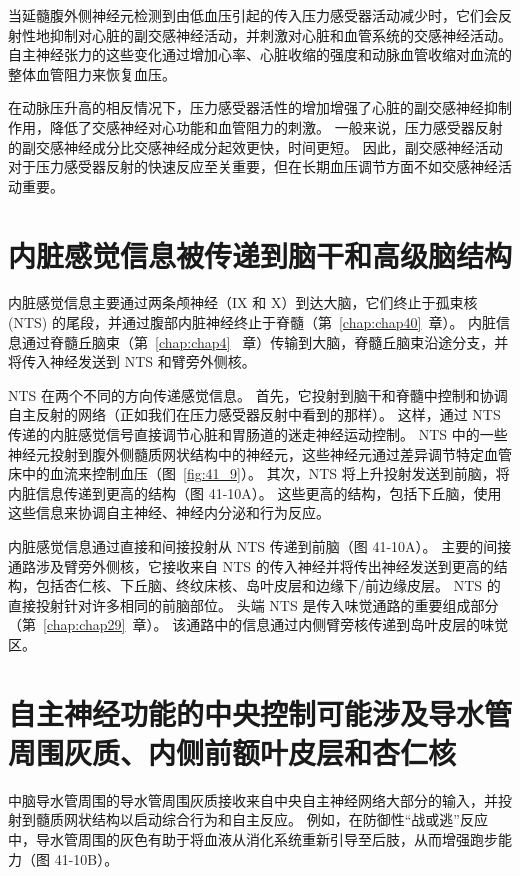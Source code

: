 当延髓腹外侧神经元检测到由低血压引起的传入压力感受器活动减少时，它们会反射性地抑制对心脏的副交感神经活动，并刺激对心脏和血管系统的交感神经活动。
自主神经张力的这些变化通过增加心率、心脏收缩的强度和动脉血管收缩对血流的整体血管阻力来恢复血压。


在动脉压升高的相反情况下，压力感受器活性的增加增强了心脏的副交感神经抑制作用，降低了交感神经对心功能和血管阻力的刺激。
一般来说，压力感受器反射的副交感神经成分比交感神经成分起效更快，时间更短。
因此，副交感神经活动对于压力感受器反射的快速反应至关重要，但在长期血压调节方面不如交感神经活动重要。



\section{内脏感觉信息被传递到脑干和高级脑结构}

内脏感觉信息主要通过两条颅神经（IX 和 X）到达大脑，它们终止于孤束核 (NTS) 的尾段，并通过腹部内脏神经终止于脊髓（第~\ref{chap:chap40}~章）。
内脏信息通过脊髓丘脑束（第~\ref{chap:chap4}~ 章）传输到大脑，脊髓丘脑束沿途分支，并将传入神经发送到 NTS 和臂旁外侧核。


NTS 在两个不同的方向传递感觉信息。
首先，它投射到脑干和脊髓中控制和协调自主反射的网络（正如我们在压力感受器反射中看到的那样）。
这样，通过 NTS 传递的内脏感觉信号直接调节心脏和胃肠道的迷走神经运动控制。
NTS 中的一些神经元投射到腹外侧髓质网状结构中的神经元，这些神经元通过差异调节特定血管床中的血流来控制血压（图~\ref{fig:41_9}）。
其次，NTS 将上升投射发送到前脑，将内脏信息传递到更高的结构（图 41-10A）。
这些更高的结构，包括下丘脑，使用这些信息来协调自主神经、神经内分泌和行为反应。


内脏感觉信息通过直接和间接投射从 NTS 传递到前脑（图 41-10A）。
主要的间接通路涉及臂旁外侧核，它接收来自 NTS 的传入神经并将传出神经发送到更高的结构，包括杏仁核、下丘脑、终纹床核、岛叶皮层和边缘下/前边缘皮层。
NTS 的直接投射针对许多相同的前脑部位。
头端 NTS 是传入味觉通路的重要组成部分（第~\ref{chap:chap29}~章）。
该通路中的信息通过内侧臂旁核传递到岛叶皮层的味觉区。



\section{自主神经功能的中央控制可能涉及导水管周围灰质、内侧前额叶皮层和杏仁核}

中脑导水管周围的导水管周围灰质接收来自中央自主神经网络大部分的输入，并投射到髓质网状结构以启动综合行为和自主反应。
例如，在防御性“战或逃”反应中，导水管周围的灰色有助于将血液从消化系统重新引导至后肢，从而增强跑步能力（图 41-10B）。


